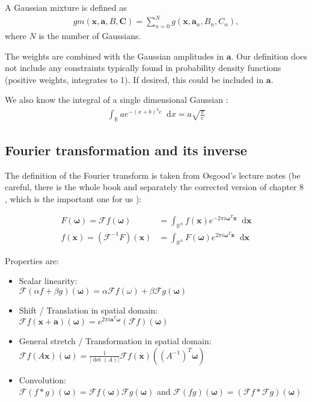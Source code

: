 \documentclass{paper}
\newcommand{\abs}[1]{\left| #1 \right|}
\newcommand{\F}{\ensuremath{\mathcal{F}}}
\newcommand{\vr}[1]{\ensuremath{\boldsymbol{#1}}}
\newcommand{\tr}[1]{\ensuremath{\boldsymbol{#1}}}
\newcommand{\f}[1]{#1}
\newcommand*\diff{\mathop{}\!\mathrm{d}}
\newcommand{\omegavec}[0]{\ensuremath{\vr{\omega{}}}}
\newcommand{\avec}[0]{\ensuremath{\vr{a}}}
\newcommand{\xvec}[0]{\ensuremath{\vr{x}}}
\begin{document}
A Gaussian mixture is defined as
\begin{align}
	\f{gm}(\vr{x}, \vr{a}, B, \tr{C}) = \sum_{n=0}^{N} g(\vr{x}, \vr{a}_n, B_{n}, C_{n}),
\end{align}
where $N$ is the number of Gaussians.

The weights are combined with the Gaussian amplitudes in $\vr{a}$.
Our definition does not include any constraints typically found in probability density functions (positive weights, integrates to 1).
If desired, this could be included in $\vr{a}$.

We also know the integral of a single dimensional Gaussian \cite{wiki_gaussian_int}:
\begin{align}
	\label{eq:gaussian_integral}
	\int_{\mathbb{R}} a e^{-(x+b)^2 c} \diff x = a\sqrt{\frac{\pi}{c}}
\end{align}

\subsection*{Fourier transformation and its inverse}
The definition of the Fourier transform is taken from Osgood's lecture notes (be careful, there is the whole book \cite{osgood_book} and separately the corrected version of chapter 8 \cite{osgood_chapter8}, which is the important one for us ):

\begin{align}
	\f{F} (\vr{\omega}) = \F \f{f} (\vr{\omega}) &= \int_{\mathbb{R}^n} \f{f}(\vr{x}) e^{-2 \pi i \vr{\omega}^T \vr{x}} \diff \vr{x} \\
	\f{f} (\vr{x}) = (\F^{-1} \f{F}) (\vr{x}) &= \int_{\mathbb{R}^n} \f{F}(\vr{\omega}) e^{2 \pi i \vr{\omega}^T \vr{x}} \diff \vr{x}
\end{align}

Properties are:
\begin{itemize}
	\item Scalar linearity: \\
	      $\F(\alpha \f{f} + \beta g)(\omegavec) = \alpha \F \f{f}(\omega) + \beta \F g(\omegavec)$
	\item Shift / Translation in spatial domain: \\
	      $\F\f{f}(\xvec + \avec)(\omegavec) = e^{2 \pi i \avec^T \omegavec} (\F \f{f})(\omegavec)$
	\item General stretch / Transformation in spatial domain:\\
		  $\F\f{f}(A\vr{x})(\omegavec) = \frac{1}{\abs{\det(A)}} \F \f{f}(\xvec)((A^{-1})^T\omegavec)$
	\item Convolution:\\
		  $\F(\f{f}\ast g)(\omegavec) = \F\f{f}(\omegavec) \F g(\omegavec)$ and $\F(\f{f}g)(\omegavec) = (\F\f{f} \ast \F g)(\omegavec)$
\end{itemize}
\end{document}
